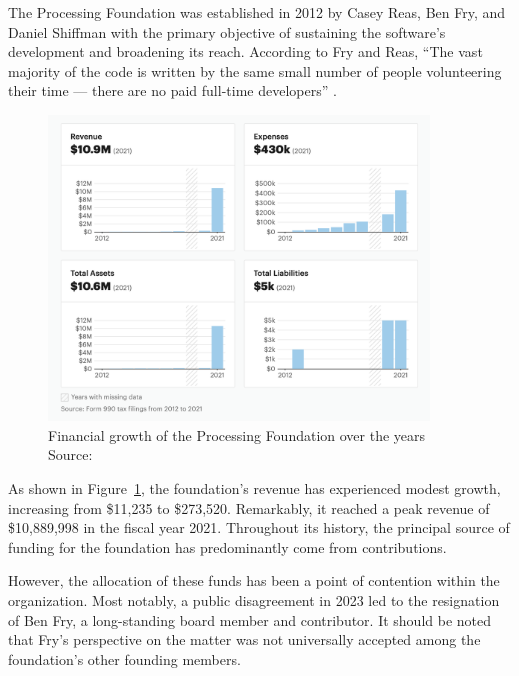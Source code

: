 The Processing Foundation was established in 2012 by Casey Reas, Ben Fry, and Daniel Shiffman with the primary objective of sustaining the software's development and broadening its reach. According to Fry and Reas, ``The vast majority of the code is written by the same small number of people volunteering their time — there are no paid full-time developers'' \parencite[p.~13]{fryModernPrometheusHistory2018}.

\begin{figure}[h]
	\centering
	\includegraphics[width=0.9\textwidth]{images/foundation-finances.png}
	\caption{Financial growth of the Processing Foundation over the years Source: \parencite{ProcessingFoundationNonprofit2013}}
	\label{fig:foundation-finances}
\end{figure}

As shown in Figure~\ref{fig:foundation-finances}, the foundation's revenue has experienced modest growth, increasing from \$11,235 to \$273,520. Remarkably, it reached a peak revenue of \$10,889,998 in the fiscal year 2021. Throughout its history, the principal source of funding for the foundation has predominantly come from contributions.

However, the allocation of these funds has been a point of contention within the organization. Most notably, a public disagreement in 2023 led to the resignation of Ben Fry, a long-standing board member and contributor. It should be noted that Fry's perspective on the matter was not universally accepted among the foundation's other founding members. \parencite{benfry[@ben_fry]HaveMadeExtremely2023} \parencite{caseyreas[@reas]EarlierThisWeek2023} \parencite{danielshiffman[@shiffman]WouldPostNote2023}

